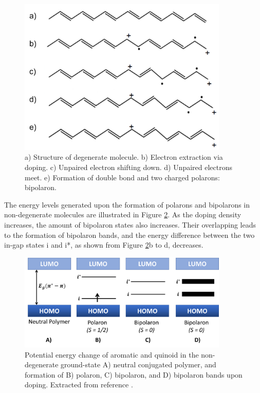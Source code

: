 \begin{figure}[ht]
  \centering
  \includegraphics[width=10cm]{Images/pdf/bipolaron.pdf}
  \caption[Representation of bipolaron formation introduced via doping]{a) Structure of degenerate molecule. b) Electron extraction via doping. c) Unpaired electron shifting down. d) Unpaired electrons meet. e) Formation of double bond and two charged polarons: bipolaron.}
  \label{fig:bipol}
\end{figure}

The energy levels generated upon the formation of polarons and bipolarons in non-degenerate molecules are illustrated in Figure \ref{fig:ebipol}. As the doping density increases, the amount of bipolaron states also increases. Their overlapping leads to the formation of bipolaron bands, and the energy difference between the two in-gap states i and i*, as shown from Figure \ref{fig:ebipol}b to d, decreases. %

\begin{figure}[ht]
  \centering
  \includegraphics[width=10cm]{Images/pdf/bipolaron_bands.pdf}
  \caption[Formation of polaron, bipolaron, and bipolaron band]{Potential energy change of aromatic and quinoid in the non-degenerate ground-state A) neutral conjugated polymer, and formation of B) polaron, C) bipolaron, and D) bipolaron bands upon doping. Extracted from reference \cite{heydarigharahcheshmehTextureNanostructuralEngineering2020}.}
  \label{fig:ebipol}
\end{figure}

